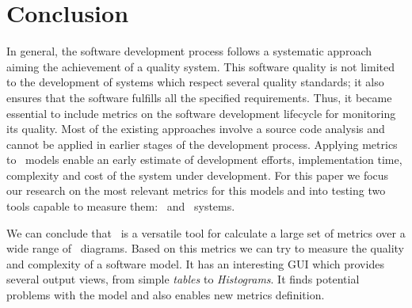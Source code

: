 \section{Conclusion} \label{conc}

In general, the software development process follows a systematic approach aiming the achievement of a quality system.
This software quality is not limited to the development of systems which respect several quality standards; it also ensures that the software fulfills all the specified requirements.
Thus, it became essential to include metrics on the software development lifecycle for monitoring its quality.
Most of the existing approaches involve a source code analysis and cannot be applied in earlier stages of the development process.
Applying metrics to \uml\ models enable an early estimate of development efforts, implementation time, complexity and cost of the system under development.
For this paper we focus our research on the most relevant metrics for this models and into testing two tools capable to measure them: \sdmetrics\ and  \entArch\ systems.


We can conclude that \sdmetrics\ is a versatile tool for calculate a large set of metrics over a wide range of \uml\ diagrams. Based on this metrics we can try to measure the quality and complexity of a software model.
It has an interesting GUI which provides several output views, from simple \emph{tables} to \emph{Histograms}. It finds potential problems with the model and also enables new metrics definition.

